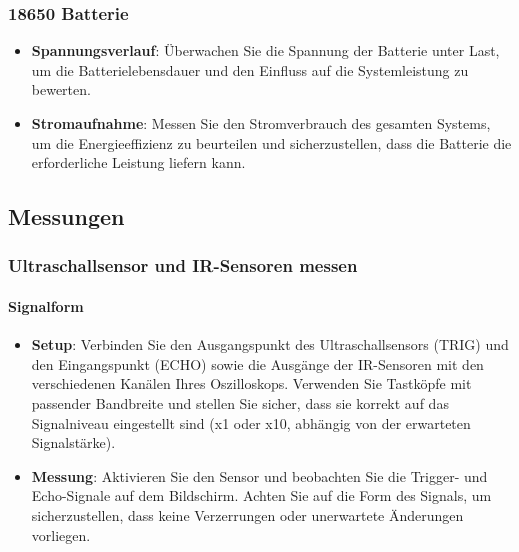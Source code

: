 \documentclass{vorlage-design-main}
\begin{document}
\hypertarget{batterie}{%
\subsubsection{18650 Batterie}\label{batterie}}

\begin{itemize}

\item
  \textbf{Spannungsverlauf}: Überwachen Sie die Spannung der Batterie
  unter Last, um die Batterielebensdauer und den Einfluss auf die
  Systemleistung zu bewerten.
\item
  \textbf{Stromaufnahme}: Messen Sie den Stromverbrauch des gesamten
  Systems, um die Energieeffizienz zu beurteilen und sicherzustellen,
  dass die Batterie die erforderliche Leistung liefern kann.
\end{itemize}

\hypertarget{messungen}{%
\subsection{Messungen}\label{messungen}}

\hypertarget{ultraschallsensor-und-ir-sensoren-messen}{%
\subsubsection{Ultraschallsensor und IR-Sensoren
messen}\label{ultraschallsensor-und-ir-sensoren-messen}}

\hypertarget{signalform}{%
\paragraph{Signalform}\label{signalform}}

\begin{itemize}

\item
  \textbf{Setup}: Verbinden Sie den Ausgangspunkt des Ultraschallsensors
  (TRIG) und den Eingangspunkt (ECHO) sowie die Ausgänge der IR-Sensoren
  mit den verschiedenen Kanälen Ihres Oszilloskops. Verwenden Sie
  Tastköpfe mit passender Bandbreite und stellen Sie sicher, dass sie
  korrekt auf das Signalniveau eingestellt sind (x1 oder x10, abhängig
  von der erwarteten Signalstärke).
\item
  \textbf{Messung}: Aktivieren Sie den Sensor und beobachten Sie die
  Trigger- und Echo-Signale auf dem Bildschirm. Achten Sie auf die Form
  des Signals, um sicherzustellen, dass keine Verzerrungen oder
  unerwartete Änderungen vorliegen.
\end{itemize}
\end{document}
